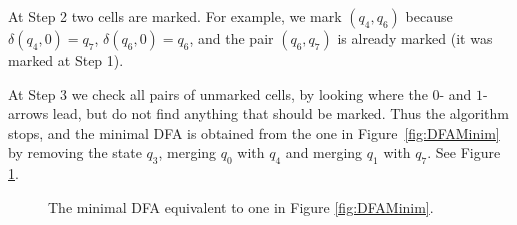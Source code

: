 \begin{page}
\begin{exl}
At Step 2 two cells are marked.
For example, we mark $(q_4, q_6)$ because $\delta(q_4, 0) = q_7$, $\delta(q_6, 0) = q_6$, and the pair $(q_6, q_7)$ is already marked (it was marked at Step 1).

At Step 3 we check all pairs of unmarked cells, by looking where the $0$- and $1$-arrows lead, but do not find anything that should be marked.
Thus the algorithm stops, and the minimal DFA is obtained from the one in Figure~\ref{fig:DFAMinim} by removing the state $q_3$,
merging $q_0$ with $q_4$ and merging $q_1$ with $q_7$. See Figure \ref{fig:DFAMinimResult}.

\begin{figure}[ht]
\begin{center}

\end{center}
\caption{The minimal DFA equivalent to one in Figure \ref{fig:DFAMinim}.}
\label{fig:DFAMinimResult}
\end{figure}
\end{exl}

\end{page}

\begin{page}





\newpage


\end{page}

